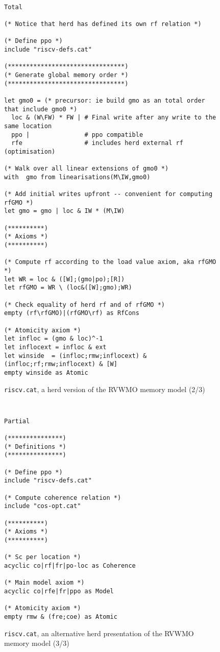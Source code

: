 \begin{figure}[ht!]
  {
  \tt\bfseries\centering\footnotesize
  \begin{lstlisting}
Total

(* Notice that herd has defined its own rf relation *)

(* Define ppo *)
include "riscv-defs.cat"

(********************************)
(* Generate global memory order *)
(********************************)

let gmo0 = (* precursor: ie build gmo as an total order that include gmo0 *)
  loc & (W\FW) * FW | # Final write after any write to the same location
  ppo |               # ppo compatible
  rfe                 # includes herd external rf (optimisation)

(* Walk over all linear extensions of gmo0 *)
with  gmo from linearisations(M\IW,gmo0)

(* Add initial writes upfront -- convenient for computing rfGMO *)
let gmo = gmo | loc & IW * (M\IW)

(**********)
(* Axioms *)
(**********)

(* Compute rf according to the load value axiom, aka rfGMO *)
let WR = loc & ([W];(gmo|po);[R])
let rfGMO = WR \ (loc&([W];gmo);WR)

(* Check equality of herd rf and of rfGMO *)
empty (rf\rfGMO)|(rfGMO\rf) as RfCons

(* Atomicity axiom *)
let infloc = (gmo & loc)^-1
let inflocext = infloc & ext
let winside  = (infloc;rmw;inflocext) & (infloc;rf;rmw;inflocext) & [W]
empty winside as Atomic
\end{lstlisting}
  }
  \caption{{\tt riscv.cat}, a herd version of the RVWMO memory model (2/3)}
  \label{fig:herd2}
\end{figure}

\begin{figure}[h!]
  {
  \tt\bfseries\centering\footnotesize
  \begin{lstlisting}
Partial

(***************)
(* Definitions *)
(***************)

(* Define ppo *)
include "riscv-defs.cat"

(* Compute coherence relation *)
include "cos-opt.cat"

(**********)
(* Axioms *)
(**********)

(* Sc per location *)
acyclic co|rf|fr|po-loc as Coherence

(* Main model axiom *)
acyclic co|rfe|fr|ppo as Model

(* Atomicity axiom *)
empty rmw & (fre;coe) as Atomic
\end{lstlisting}
  }
  \caption{{\tt riscv.cat}, an alternative herd presentation of the RVWMO memory model (3/3)}
  \label{fig:herd3}
\end{figure}

\clearpage

